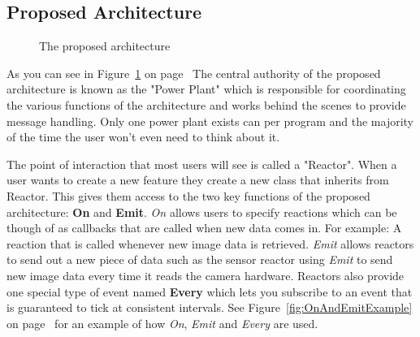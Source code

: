 \documentclass[english,12pt]{scrartcl}
\begin{document}
        \subsection{Proposed Architecture}
            \begin{figure}[h]
                \centering
                \caption {The proposed architecture}
                \label{fig:HighLevelProposedArchitecture}
            \end{figure}

            As you can see in Figure~\ref{fig:HighLevelProposedArchitecture} on page~\pageref{fig:HighLevelProposedArchitecture} 
            The central authority of the proposed architecture is known as the "Power Plant" which
            is responsible for coordinating the various functions of the architecture and works
            behind the scenes to provide message handling. Only one power plant exists can per
            program and the majority of the time the user won't even need to think about it. 
            
            The point of interaction that most users will see is called a "Reactor". When a user
            wants to create a new feature they create a new class that inherits from Reactor. This
            gives them access to the two key functions of the proposed architecture: \textbf{On} and
            \textbf{Emit}. \emph{On} allows users to specify reactions which can be though of as
            callbacks that are called when new data comes in. For example: A reaction that is called
            whenever new image data is retrieved. \emph{Emit} allows reactors to send out a new
            piece of data such as the sensor reactor using \emph{Emit} to send new image data every
            time it reads the camera hardware. Reactors also provide one special type of event named
            \textbf{Every} which lets you subscribe to an event that is guaranteed to tick at
            consistent intervals. See Figure~\ref{fig:OnAndEmitExample} on
            page~\pageref{fig:OnAndEmitExample} for an example of how \emph{On}, \emph{Emit} and
            \emph{Every} are used.
            
\end{document}
